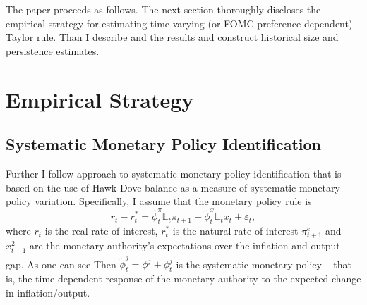 \documentclass[11pt]{article}
\begin{document}




The paper proceeds as follows.
The next section thoroughly discloses the empirical strategy for estimating time-varying (or FOMC preference dependent) Taylor rule.
Than I describe and the results and construct historical size and persistence estimates.



\section{Empirical Strategy}
\subsection{Systematic Monetary Policy Identification}

Further I follow \citet{HIM2023} approach to systematic monetary policy identification that is based on the use of Hawk-Dove balance as a measure of systematic monetary policy variation. Specifically, I assume that the monetary policy rule is 
\begin{equation}
  r_t-r_t^*=\tilde\phi_{t}^\pi \mathbb{E}_t\pi_{t+1} +\tilde\phi_{t}^x \mathbb{E}_tx_{t}+\varepsilon_t,\label{eq:Taylor1}
\end{equation}
where $r_t$ is the real rate of interest, $r_t^*$ is the natural rate of interest $\pi_{t+1}^e$ and $x_{t+1}^2$ are the monetary authority's expectations over the inflation and output gap. As one can see Then $\tilde \phi_t^{j}=\phi^j+\phi_t^j$ is the systematic monetary policy -- that is, the time-dependent response of the monetary authority to the expected change in inflation/output. 
\end{document}

